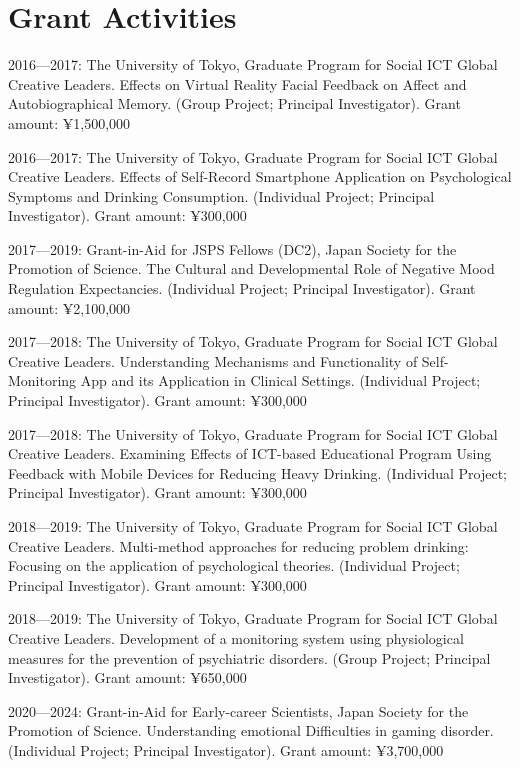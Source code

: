\documentclass[a4paper]{article}
\begin{document}
\section{Grant Activities}
\begin{description}
	\item 2016---2017: The University of Tokyo, Graduate Program for Social ICT Global Creative Leaders. Effects on Virtual Reality Facial Feedback on Affect and Autobiographical Memory. (Group Project; Principal Investigator). Grant amount: ¥1,500,000
	\item 2016---2017: The University of Tokyo, Graduate Program for Social ICT Global Creative Leaders. Effects of Self-Record Smartphone Application on Psychological Symptoms and Drinking Consumption. (Individual Project; Principal Investigator). Grant amount: ¥300,000
	\item 2017---2019: Grant-in-Aid for JSPS Fellows (DC2), Japan Society for the Promotion of Science. The Cultural and Developmental Role of Negative Mood Regulation Expectancies. (Individual Project; Principal Investigator). Grant amount: ¥2,100,000
	\item 2017---2018: The University of Tokyo, Graduate Program for Social ICT Global Creative Leaders. Understanding Mechanisms and Functionality of Self-Monitoring App and its Application in Clinical Settings. (Individual Project; Principal Investigator). Grant amount: ¥300,000
	\item 2017---2018: The University of Tokyo, Graduate Program for Social ICT Global Creative Leaders. Examining Effects of ICT-based Educational Program Using Feedback with Mobile Devices for Reducing Heavy Drinking. (Individual Project; Principal Investigator). Grant amount: ¥300,000
	\item 2018---2019: The University of Tokyo, Graduate Program for Social ICT Global Creative Leaders. Multi-method approaches for reducing problem drinking: Focusing on the application of psychological theories. (Individual Project; Principal Investigator). Grant amount: ¥300,000
	\item 2018---2019: The University of Tokyo, Graduate Program for Social ICT Global Creative Leaders. Development of a monitoring system using physiological measures for the prevention of psychiatric disorders. (Group Project; Principal Investigator). Grant amount: ¥650,000
	\item 2020---2024: Grant-in-Aid for Early-career Scientists, Japan Society for the Promotion of Science. Understanding emotional Difficulties in gaming disorder. (Individual Project; Principal Investigator). Grant amount: ¥3,700,000

\end{description}
\end{document}
